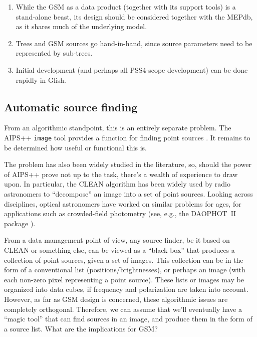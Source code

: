 \documentclass[10pt]{article}
\begin{document}
\begin{enumerate}

\item While the GSM as a data product (together with its support tools) is a
stand-alone beast, its design should be considered together with the MEPdb, as
it shares much of the underlying model.

\item Trees and GSM sources go hand-in-hand, since source parameters need 
to be represented by sub-trees.

\item Initial development (and perhaps all PSS4-scope development) can be done
rapidly in Glish.

\end{enumerate}

\subsection{Automatic source finding}

From an algorithmic standpoint, this is an entirely separate problem. The
AIPS++ {\tt image} tool provides a function for finding point sources
\cite{image-fs}. It remains to be determined how useful or functional this is.

The problem has also been widely studied in the literature, so, should the
power of AIPS++ prove not up to the task, there's a wealth of experience to
draw upon. In particular, the CLEAN algorithm \cite{clean} \cite{clean2} has
been widely used by radio astronomers to ``decompose'' an image into a set of
point sources.  Looking across disciplines, optical astronomers have worked on
similar problems for ages, for applications such as crowded-field photometry
(see, e.g., the DAOPHOT~II package \cite{daophot}).

From a data management point of view, any source finder, be it based on CLEAN
or something else, can be viewed as a ``black box'' that produces a collection
of point sources, given a set of images. This collection can be in the form of
a conventional list (positions/brightnesses), or perhaps an image (with each
non-zero pixel representing a point source). These lists or images may be
organized into data cubes, if frequency and polarization are taken into
account. However, as far as GSM design is concerned, these algorithmic issues
are completely orthogonal. Therefore, we can assume that we'll eventually have
a ``magic tool'' that can find sources in an image, and produce them in the form
of a source list. What are the implications for GSM?
\end{document}
